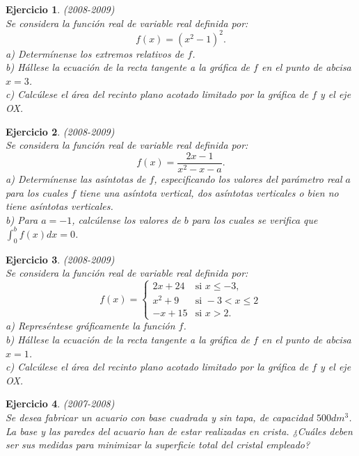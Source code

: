 \documentclass[12pt, a4paper]{amsart}
\newtheorem{ejer}{Ejercicio}
\begin{document}
\begin{ejer}\em (2008-2009)\\%
Se considera la función real de variable real definida por:
$$
f(x)=(x^2-1)^2.
$$
a) Determínense los extremos relativos de $f$.\\
b) Hállese la ecuación de la recta tangente a la gráfica de $f$ en el punto de abcisa $x=3$.\\
c) Calcúlese el área del recinto plano acotado limitado por la gráfica de  $f$ y el eje OX.
\end{ejer}

\begin{ejer}\em (2008-2009)\\
Se considera la función real de variable real definida por:
$$
f(x)=\frac{2x-1}{x^2-x-a}.
$$
a) Determínense las asíntotas de $f$, especificando los valores del parámetro real $a$ para los cuales $f$ tiene una asíntota vertical, dos asíntotas verticales o bien no tiene asíntotas verticales.\\
b) Para $a=-1$, calcúlense los valores de $b$ para los cuales se verifica que $\int_0^b f(x)dx=0$.
\end{ejer}

\begin{ejer}\em (2008-2009)\\%
Se considera la función real de variable real definida por:
\begin{equation*}
f(x)=\left \{ \begin{matrix} 2x+24 & \mbox{si } x\leq -3,
\\ x^2+9 & \mbox{si } -3<x\leq 2
\\ -x+15 & \mbox{si } x>2. \end{matrix}\right. 
\end{equation*}
a) Represéntese gráficamente la función $f$.\\
b) Hállese la ecuación de la recta tangente a la gráfica de $f$ en el punto de abcisa $x=1$.\\
c) Calcúlese el área del recinto plano acotado limitado por la gráfica de $f$ y el eje OX.
\end{ejer}

\begin{ejer}\em  (2007-2008)\\
Se desea fabricar un acuario con base cuadrada y sin tapa, de capacidad $500 dm^3$. La base y las paredes del acuario han de estar realizadas en crista. ¿Cuáles deben ser sus medidas para minimizar la superficie total del cristal empleado?
\end{ejer}
\end{document}
